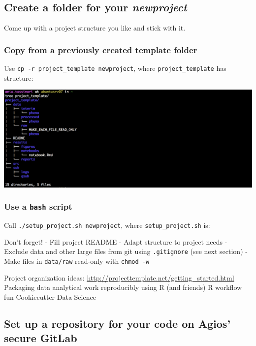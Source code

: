 \documentclass[openany]{book}
\begin{document}
\hypertarget{create-a-folder-for-your-newproject}{%
\subsection{\texorpdfstring{Create a folder for your \emph{newproject}}{Create a folder for your newproject}}\label{create-a-folder-for-your-newproject}}

Come up with a project structure you like and stick with it.

\hypertarget{copy-from-a-previously-created-template-folder}{%
\subsubsection{Copy from a previously created template folder}\label{copy-from-a-previously-created-template-folder}}

Use \texttt{cp\ -r\ project\_template\ newproject}, where \texttt{project\_template} has structure:

\includegraphics[width=0.8\linewidth]{images/projectstructure}

\hypertarget{use-a-bash-script}{%
\subsubsection{\texorpdfstring{Use a \texttt{bash} script}{Use a bash script}}\label{use-a-bash-script}}

Call \texttt{./setup\_project.sh\ newproject}, where \texttt{setup\_project.sh} is:

Don't forget!
- Fill project README
- Adapt structure to project needs
- Exclude data and other large files from git using \texttt{.gitignore} (see next section)
- Make files in \texttt{data/raw} read-only with \texttt{chmod\ -w}

Project organization ideas:
\url{http://projecttemplate.net/getting_started.html}
Packaging data analytical work reproducibly using R (and friends)
R workflow fun
Cookiecutter Data Science

\hypertarget{set-up-a-repository-for-your-code-on-agios-secure-gitlab}{%
\subsection{Set up a repository for your code on Agios' secure GitLab}\label{set-up-a-repository-for-your-code-on-agios-secure-gitlab}}
\end{document}

